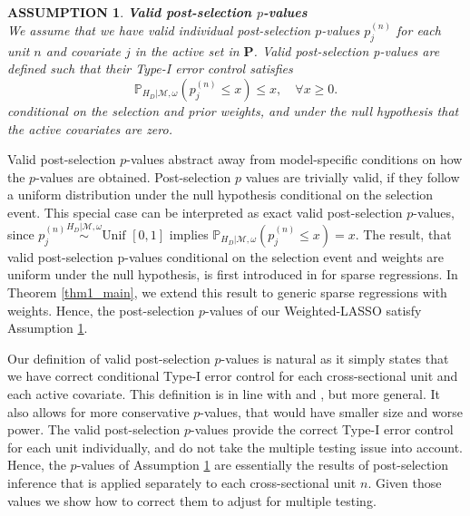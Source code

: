 \documentclass[11pt]{article}
\newcommand{\PP}{\mathbb{P}}
\newtheorem{assumption}{ASSUMPTION}
\begin{document}
\begin{assumption}{\bf Valid post-selection $p$-values}\label{assu:valid_p}\\
	We assume that we have valid individual post-selection $p$-values $p_j^{(n)}$ for each unit $n$ and covariate $j$ in the active set in $\bm{P}$. Valid post-selection p-values are defined such that their Type-I error control satisfies
	$$\PP_{H_D|\mathcal{M},\omega}(p^{(n)}_j \leq x)\leq x,\quad \forall x\geq 0.$$
	conditional on the selection and prior weights, and under the null hypothesis that the active covariates are zero. 
\end{assumption}

Valid post-selection $p$-values abstract away from model-specific conditions on how the $p$-values are obtained. Post-selection $p$ values are trivially valid, if they follow a uniform distribution under the null hypothesis conditional on the selection event. This special case can be interpreted as exact valid post-selection $p$-values, since $p^{(n)}_j \stackrel{H_D|\mathcal{M},\omega}{\sim} \textrm{Unif }[0,1]$ implies $\PP_{H_D|\mathcal{M},\omega}(p^{(n)}_j \leq x)= x$. The result, that valid post-selection p-values conditional on the selection event and weights are uniform under the null hypothesis, is first introduced in \cite{tibshirani2016exact} for sparse regressions. In Theorem \ref{thm1_main}, we extend this result to generic sparse regressions with weights. Hence, the post-selection $p$-values of our Weighted-LASSO satisfy Assumption \ref{assu:valid_p}.

Our definition of valid post-selection $p$-values is natural as it simply states that we have correct conditional Type-I error control for each cross-sectional unit and each active covariate. This definition is in line with \cite{tibshirani2016exact} and \cite{heard2018choosing}, but more general. It also allows for more conservative $p$-values, that would have smaller size and worse power. The valid post-selection $p$-values provide the correct Type-I error control for each unit individually, and do not take the multiple testing issue into account. Hence, the $p$-values of Assumption \ref{assu:valid_p} are essentially the results of post-selection inference that is applied separately to each cross-sectional unit $n$. Given those values we show how to correct them to adjust for multiple testing. 
\end{document}
